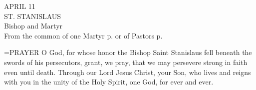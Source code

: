 \begin{center}\normalsize APRIL 11\\
\footnotesize ST. STANISLAUS\\
\footnotesize Bishop and Martyr\\
\footnotesize From the common of one Martyr p.   or of Pastors p. \\
\end{center}

\hangindent=\parindent \small{PRAYER 
O God, for whose honor the Bishop Saint Stanislaus
fell beneath the swords of his persecutors,
grant, we pray,
that we may persevere strong in faith even until death.
Through our Lord Jesus Christ, your Son,
who lives and reigns with you in the unity of the Holy Spirit,
one God, for ever and ever.\\}
 
